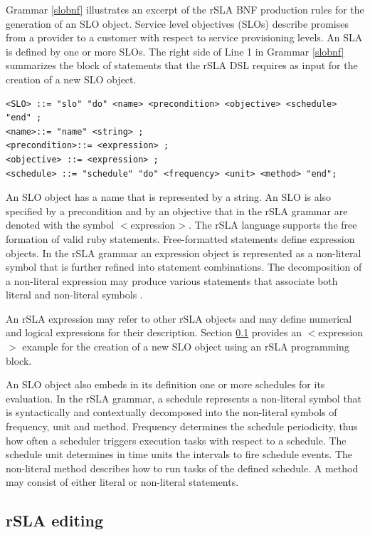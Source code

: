 Grammar \ref{slobnf} illustrates an excerpt of the rSLA BNF production rules for the generation of an SLO object. Service level objectives (SLOs) describe promises from a provider to a customer with respect to service provisioning levels\cite{wsla}. An SLA is defined by one or more SLOs. The right side of Line 1 in Grammar \ref{slobnf} summarizes the block of statements that the rSLA DSL requires as input for the creation of a new SLO object.
\begin{lstlisting}[caption= Service level objective (SLO) production rules, label=slobnf]
<SLO> ::= "slo" "do" <name> <precondition> <objective> <schedule> "end" ;
<name>::= "name" <string> ;
<precondition>::= <expression> ;
<objective> ::= <expression> ;
<schedule> ::= "schedule" "do" <frequency> <unit> <method> "end";
\end{lstlisting} 
An SLO object has a name that is represented by a string. An SLO is also specified by a precondition and by an objective that in the rSLA grammar are denoted with the symbol $<$expression$>$. 
The rSLA language supports the free formation of valid ruby statements. Free-formatted statements define expression objects. In the rSLA grammar an expression object is represented as a non-literal symbol that is further refined into statement combinations. The decomposition of a non-literal expression may produce various statements that associate both literal and non-literal symbols . 

An rSLA expression may refer to other rSLA objects and may define numerical and logical expressions for their description. Section \ref{editing} provides an $<$expression$>$ example for the creation of a new SLO object using an rSLA programming block.

An SLO object also embeds in its definition one or more schedules for its evaluation. In the rSLA grammar, a schedule represents a non-literal symbol that is syntactically and contextually decomposed into the non-literal symbols of frequency, unit and method. Frequency determines the schedule periodicity, thus how often a scheduler triggers execution tasks with respect to a schedule. The schedule unit determines in time units the intervals to fire schedule events. The non-literal method describes how to run tasks of the defined schedule. A method may consist of either literal or non-literal statements.

\subsection{rSLA editing}\label{editing}


